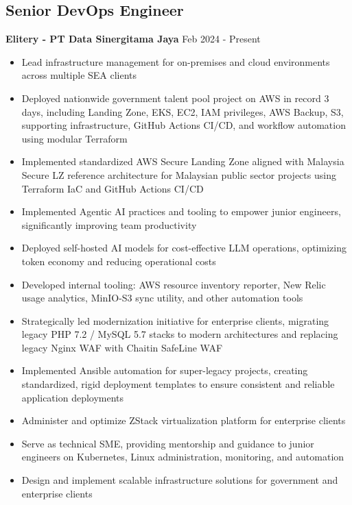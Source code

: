 \documentclass[11pt,a4paper]{article}
\newcommand{\company}[1]{\textbf{\color{primary}#1}}
\newcommand{\daterange}[1]{\color{secondary}#1}  %
\begin{document}
\subsection{Senior DevOps Engineer}
\company{Elitery - PT Data Sinergitama Jaya} \hfill \daterange{Feb 2024 - Present}
\begin{itemize}[leftmargin=*, itemsep=2pt]
    \item Lead infrastructure management for on-premises and cloud environments across multiple SEA clients
    \item Deployed nationwide government talent pool project on AWS in record 3 days, including Landing Zone, EKS, EC2, IAM privileges, AWS Backup, S3, supporting infrastructure, GitHub Actions CI/CD, and workflow automation using modular Terraform
    \item Implemented standardized AWS Secure Landing Zone aligned with Malaysia Secure LZ reference architecture for Malaysian public sector projects using Terraform IaC and GitHub Actions CI/CD
    \item Implemented Agentic AI practices and tooling to empower junior engineers, significantly improving team productivity
    \item Deployed self-hosted AI models for cost-effective LLM operations, optimizing token economy and reducing operational costs
    \item Developed internal tooling: AWS resource inventory reporter, New Relic usage analytics, MinIO-S3 sync utility, and other automation tools
    \item Strategically led modernization initiative for enterprise clients, migrating legacy PHP 7.2 / MySQL 5.7 stacks to modern architectures and replacing legacy Nginx WAF with Chaitin SafeLine WAF
    \item Implemented Ansible automation for super-legacy projects, creating standardized, rigid deployment templates to ensure consistent and reliable application deployments
    \item Administer and optimize ZStack virtualization platform for enterprise clients
    \item Serve as technical SME, providing mentorship and guidance to junior engineers on Kubernetes, Linux administration, monitoring, and automation
    \item Design and implement scalable infrastructure solutions for government and enterprise clients
\end{itemize}
\end{document}
